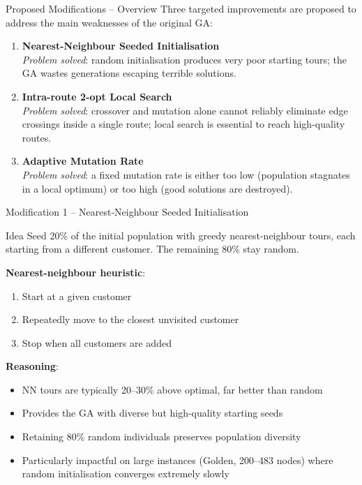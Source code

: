 \documentclass[aspectratio=169]{beamer}
\begin{document}
\begin{frame}{Proposed Modifications -- Overview}
  Three targeted improvements are proposed to address the main weaknesses
  of the original GA:

  \vspace{6pt}
  \begin{enumerate}
    \setlength{\itemsep}{8pt}
    \item \textbf{Nearest-Neighbour Seeded Initialisation}\\
          \textit{Problem solved}: random initialisation produces very poor
          starting tours; the GA wastes generations escaping terrible solutions.

    \item \textbf{Intra-route 2-opt Local Search}\\
          \textit{Problem solved}: crossover and mutation alone cannot reliably
          eliminate edge crossings inside a single route; local search is
          essential to reach high-quality routes.

    \item \textbf{Adaptive Mutation Rate}\\
          \textit{Problem solved}: a fixed mutation rate is either too low
          (population stagnates in a local optimum) or too high (good
          solutions are destroyed).
  \end{enumerate}
\end{frame}

\begin{frame}{Modification 1 -- Nearest-Neighbour Seeded Initialisation}
  \begin{block}{Idea}
    Seed 20\% of the initial population with greedy nearest-neighbour tours,
    each starting from a different customer.  The remaining 80\% stay random.
  \end{block}

  \vspace{4pt}
  \textbf{Nearest-neighbour heuristic}:
  \begin{enumerate}
    \item Start at a given customer
    \item Repeatedly move to the closest unvisited customer
    \item Stop when all customers are added
  \end{enumerate}

  \vspace{4pt}
  \textbf{Reasoning}:
  \begin{itemize}
    \item NN tours are typically 20--30\% above optimal, far better than random
    \item Provides the GA with diverse but high-quality starting seeds
    \item Retaining 80\% random individuals preserves population diversity
    \item Particularly impactful on large instances (Golden, 200--483 nodes)
          where random initialisation converges extremely slowly
  \end{itemize}
\end{frame}
\end{document}
